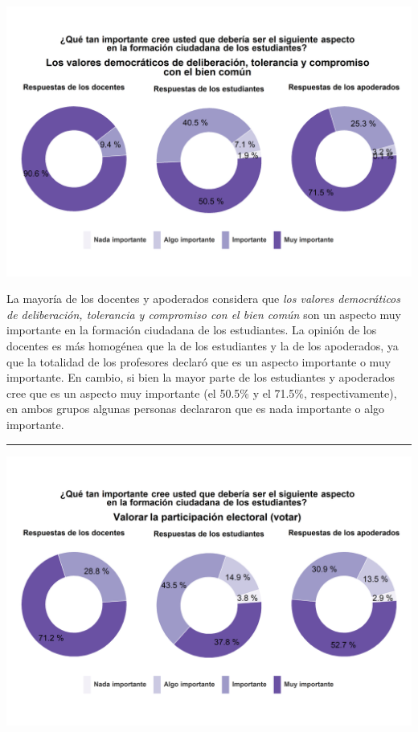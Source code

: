 \documentclass[
  14pt,
]{book}
\let\origfigure\figure
\let\endorigfigure\endfigure
\renewenvironment{figure}[1][2] {
  \expandafter\origfigure\expandafter[H]
} {
  \endorigfigure
}
\begin{document}
\begin{figure}[!ht]

{\centering \includegraphics[width=0.8\linewidth,]{images/graph_for_ciud2} 

}

\caption{Relevancia de los valores democráticos}\label{fig:unnamed-chunk-26}
\end{figure}

La mayoría de los docentes y apoderados considera que \emph{los valores democráticos de deliberación, tolerancia y compromiso con el bien común} son un aspecto muy importante en la formación ciudadana de los estudiantes. La opinión de los docentes es más homogénea que la de los estudiantes y la de los apoderados, ya que la totalidad de los profesores declaró que es un aspecto importante o muy importante. En cambio, si bien la mayor parte de los estudiantes y apoderados cree que es un aspecto muy importante (el 50.5\% y el 71.5\%, respectivamente), en ambos grupos algunas personas declararon que es nada importante o algo importante.

\begin{center}\rule{0.5\linewidth}{0.5pt}\end{center}

\begin{figure}[!ht]

{\centering \includegraphics[width=0.8\linewidth,]{images/graph_for_ciud3} 

}

\caption{Relevancia de la participación electoral}\label{fig:unnamed-chunk-27}
\end{figure}
\end{document}
